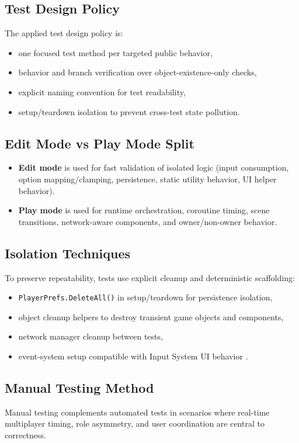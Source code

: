 \subsection*{Test Design Policy}
The applied test design policy is:
\begin{itemize}
\item one focused test method per targeted public behavior,
\item behavior and branch verification over object-existence-only checks,
\item explicit naming convention for test readability,
\item setup/teardown isolation to prevent cross-test state pollution.
\end{itemize}

\subsection*{Edit Mode vs Play Mode Split}
\begin{itemize}
\item \textbf{Edit mode} is used for fast validation of isolated logic (input consumption, option mapping/clamping, persistence, static utility behavior, UI helper behavior).
\item \textbf{Play mode} is used for runtime orchestration, coroutine timing, scene transitions, network-aware components, and owner/non-owner behavior.
\end{itemize}

\subsection*{Isolation Techniques}
To preserve repeatability, tests use explicit cleanup and deterministic scaffolding:
\begin{itemize}
\item \texttt{PlayerPrefs.DeleteAll()} in setup/teardown for persistence isolation,
\item object cleanup helpers to destroy transient game objects and components,
\item network manager cleanup between tests,
\item event-system setup compatible with Input System UI behavior \cite{unity_input_system_docs}.
\end{itemize}

\newpage

\subsection*{Manual Testing Method}
Manual testing complements automated tests in scenarios where real-time multiplayer timing, role asymmetry, and user coordination are central to correctness.

